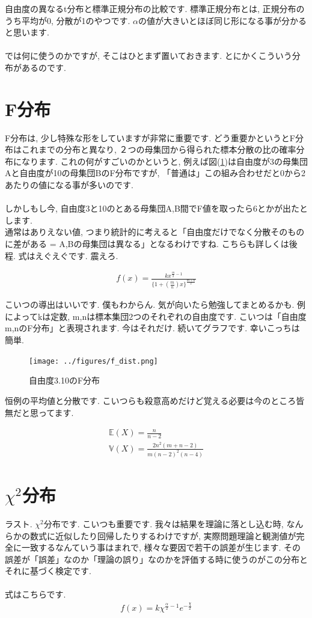 \documentclass[11pt,a4paper,uplatex]{ujreport} 	%
\begin{document}
自由度の異なるt分布と標準正規分布の比較です. 標準正規分布とは, 正規分布のうち平均が0, 分散が1のやつです. $\alpha$の値が大きいとほぼ同じ形になる事が分かると思います.\\
\\

では何に使うのかですが, そこはひとまず置いておきます. とにかくこういう分布があるのです.


\section{F分布}
F分布は, 少し特殊な形をしていますが非常に重要です. どう重要かというとF分布はこれまでの分布と異なり, ２つの母集団から得られた標本分散の比の確率分布になります. これの何がすごいのかというと, 例えば図(\ref{im:f_dist})は自由度が3の母集団Aと自由度が10の母集団BのF分布ですが, 「普通は」この組み合わせだと0から2あたりの値になる事が多いのです. \\
\\

しかしもし今, 自由度3と10のとある母集団A,B間でF値を取ったら6とかが出たとします. \\

通常はありえない値, つまり統計的に考えると「自由度だけでなく分散そのものに差がある = A,Bの母集団は異なる」となるわけですね. こちらも詳しくは後程. 式はえぐえぐです. 震えろ.

\begin{align}
f(x) = \frac{kx^{\frac{m}{2}-1}}{\{1 + (\frac{m}{n})x\}^{\frac{m+n}{2}}}
\end{align}

こいつの導出はいいです. 僕もわからん. 気が向いたら勉強してまとめるかも. 例によってkは定数, m,nは標本集団2つのそれぞれの自由度です. こいつは「自由度m,nのF分布」と表現されます. 今はそれだけ. 続いてグラフです. 幸いこっちは簡単.

\begin{figure}[H]
\label{im:f_dist}
  \centering
  \texttt{[image: ../figures/f\_dist.png]}
  \caption{自由度3.10のF分布}
\end{figure}

恒例の平均値と分散です. こいつらも殺意高めだけど覚える必要は今のところ皆無だと思ってます.

\begin{align}
\mathbb{E}(X) = \frac{n}{n-2}\\
\mathbb{V}(X) = \frac{2n^2 (m+n-2)}{m(n-2)^2(n-4)}
\end{align}

\section{$\chi^2$分布}
ラスト. $\chi^2$分布です. こいつも重要です. 我々は結果を理論に落とし込む時, なんらかの数式に近似したり回帰したりするわけですが, 実際問題理論と観測値が完全に一致するなんていう事はまれで, 様々な要因で若干の誤差が生じます. その誤差が「誤差」なのか「理論の誤り」なのかを評価する時に使うのがこの分布とそれに基づく検定です. \\
\\
式はこちらです. 
\begin{align}
f(x) = k\chi^{\frac{\alpha}{2}-1}e^{-\frac{\chi}{2}}
\end{align}
\end{document}
